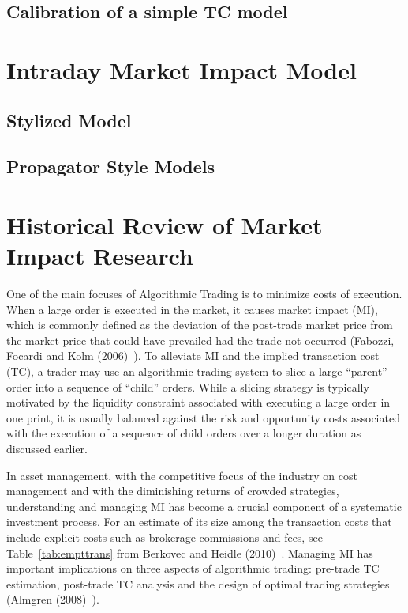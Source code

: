 \subsection{Calibration of a simple TC model}
\section{Intraday Market Impact Model}
\subsection{Stylized Model}
\subsection{Propagator Style Models}
\section{Historical Review of Market Impact Research}

One of the main focuses of Algorithmic Trading is to minimize costs of execution. When a large order is executed in the market, it causes market impact (MI), which is commonly defined as the deviation of the post-trade market price from the market price that could have prevailed had the trade not occurred (Fabozzi, Focardi and Kolm (2006)~\cite{ffk}). To alleviate MI and the implied transaction cost (TC), a trader may use an algorithmic trading system to slice a large ``parent'' order into a sequence of ``child'' orders. While a slicing strategy is typically motivated by the liquidity constraint associated with executing a large order in one print, it is usually balanced against the risk and opportunity costs associated with the execution of a sequence of child orders over a longer duration as discussed earlier.


In asset management, with the competitive focus of the industry on cost management and with the diminishing returns of crowded strategies, understanding and managing MI has become a crucial component of a systematic investment process. For an estimate of its size among the transaction costs that include explicit costs such as brokerage commissions and fees, see Table~\ref{tab:empttrans} from Berkovec and Heidle (2010)~\cite{borkoheidle}. Managing MI has important implications on three aspects of algorithmic trading: pre-trade TC estimation, post-trade TC analysis and the design of optimal trading strategies (Almgren (2008)~\cite{alm2008}).

